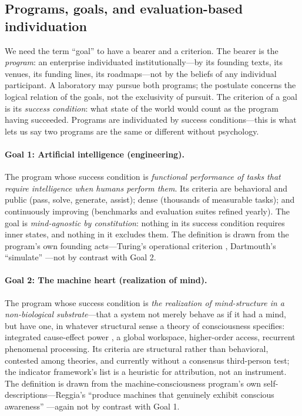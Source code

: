 \documentclass[10pt]{article}
\begin{document}
\subsection{Programs, goals, and evaluation-based individuation}\label{sec:goals}

We need the term ``goal'' to have a bearer and a criterion. The bearer is the \emph{program}: an enterprise individuated institutionally---by its founding texts, its venues, its funding lines, its roadmaps---not by the beliefs of any individual participant. A laboratory may pursue both programs; the postulate concerns the logical relation of the goals, not the exclusivity of pursuit. The criterion of a goal is its \emph{success condition}: what state of the world would count as the program having succeeded. Programs are individuated by success conditions---this is what lets us say two programs are the same or different without psychology.

\paragraph{Goal 1: Artificial intelligence (engineering).} The program whose success condition is \emph{functional performance of tasks that require intelligence when humans perform them}. Its criteria are behavioral and public (pass, solve, generate, assist); dense (thousands of measurable tasks); and continuously improving (benchmarks and evaluation suites refined yearly). The goal is \emph{mind-agnostic by constitution}: nothing in its success condition requires inner states, and nothing in it excludes them. The definition is drawn from the program's own founding acts---Turing's operational criterion \cite{turing1950}, Dartmouth's ``simulate'' \cite{mccarthy1955proposal}---not by contrast with Goal 2.

\paragraph{Goal 2: The machine heart (realization of mind).} The program whose success condition is \emph{the realization of mind-structure in a non-biological substrate}---that a system not merely behave as if it had a mind, but have one, in whatever structural sense a theory of consciousness specifies: integrated cause-effect power \cite{albantakis2023iit}, a global workspace, higher-order access, recurrent phenomenal processing. Its criteria are structural rather than behavioral, contested among theories, and currently without a consensus third-person test; the indicator framework's list \cite{butlin2023consciousness} is a heuristic for attribution, not an instrument. The definition is drawn from the machine-consciousness program's own self-descriptions---Reggia's ``produce machines that genuinely exhibit conscious awareness'' \cite{reggia2013rise}---again not by contrast with Goal 1.
\end{document}
